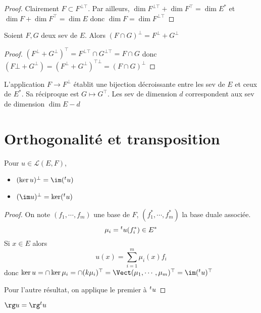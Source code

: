\begin{proof}
    Clairement $F \subset F ^{\bot \top}$. Par ailleurs, $\dim F^{\bot\top}+\dim F^\top=\dim E^*$ et $\dim F+\dim F^\top=\dim E$ donc $\dim F=\dim F^{\bot\top}$
\end{proof}

\begin{prop}
    Soient $F, G$ deux sev de  $E$. Alors  $(F\cap G)^\bot=F^\bot+G^\bot$
\end{prop}

\begin{proof}
    $(F^\bot+G^\bot)^\top=F^{\bot\top}\cap G^{\bot\top}=F\cap G$ donc $(F\bot+G^\bot)=(F^\bot+G^\bot)^{\top\bot}=(F\cap G)^\bot$
\end{proof}

\begin{thm}
L'application $F \longrightarrow F^\bot$ établit une bijection décroissante entre les sev de $E$ et ceux de $E^*$. Sa réciproque est  $G\longmapsto G^\top$. Les sev de dimension $d$ correspondent aux sev de dimension  $\dim E-d$
\end{thm}

\section{Orthogonalité et transposition}

\begin{thm}
    Pour $u \in  \mathcal  L(E, F)$, \begin{itemize}
        \item $(\ker u)^\bot=\im(\transpose u)$
        \item  $(\im u)^\bot = \ker (\transpose u)$
    \end{itemize}
\end{thm}

\begin{proof}
    On note $(f_1, \cdots , f_m)$ une base de $F$,  $(f_1^*, \cdots , f_m^*)$ la base duale associée. \[
        \mu_i={}^t u(f_i^*) \in  E^*
    \] 
    Si $x \in E$ alors \[
        u(x)=\sum_{i=1}^{m} \mu_i(x)f_i
    \] 
    donc $\ker u=\cap \ker \mu_i=\cap (k\mu_i)^\top=\Vect(\mu_1, \cdots , \mu_m)^\top=\im(\transpose u)^\top$ 

    Pour l'autre résultat, on applique le premier à ${}^t u$
\end{proof}

\begin{cor}
$\rg u=\rg \transpose u$
\end{cor}

